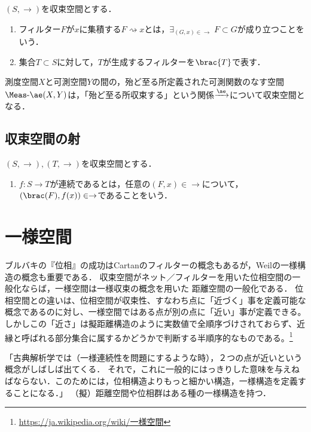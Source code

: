 \documentclass[uplatex,dvipdfmx]{jsreport}
\begin{document}
\begin{definition}
    $(S,\to)$を収束空間とする．
    \begin{enumerate}
        \item フィルター$F$が$x$に集積する$F\rightsquigarrow x$とは，$\exists_{(G,x)\in\to}\;F\subset G$が成り立つことをいう．
        \item 集合$T\subset S$に対して，$T$が生成するフィルターを$\brac{T}$で表す．
    \end{enumerate}
\end{definition}

\begin{example}
    測度空間$X$と可測空間$Y$の間の，殆ど至る所定義された可測関数のなす空間$\Meas\textrm{-}\ae(X,Y)$は，「殆ど至る所収束する」という関係$\xrightarrow{\ae}$について収束空間となる．
\end{example}

\subsection{収束空間の射}

\begin{definition}
    $(S,\to),(T,\to)$を収束空間とする．
    \begin{enumerate}
        \item $f:S\to T$が連続であるとは，任意の$(F,x)\in\to$について，$(\brac(F),f(x))\in\to$であることをいう．
    \end{enumerate}
\end{definition}

\section{一様空間}

\begin{tcolorbox}[colframe=ForestGreen, colback=ForestGreen!10!white, breakable ,colbacktitle=ForestGreen!40!white, coltitle=black,fonttitle=\bfseries\sffamily,
    title=全体のポイント]
    ブルバキの『位相』の成功はCartanのフィルターの概念もあるが，Weilの一様構造の概念も重要である．
    収束空間がネット／フィルターを用いた位相空間の一般化ならば，一様空間は一様収束の概念を用いた
    距離空間の一般化である．
    位相空間との違いは、位相空間が収束性、すなわち点に「近づく」事を定義可能な概念であるのに対し、一様空間ではある点が別の点に「近い」事が定義できる。しかしこの「近さ」は擬距離構造のように実数値で全順序づけされておらず、近縁と呼ばれる部分集合に属するかどうかで判断する半順序的なものである。\footnote{\url{https://ja.wikipedia.org/wiki/一様空間}}

    「古典解析学では（一様連続性を問題にするような時），２つの点が近いという概念がしばしば出てくる．
    それで，これに一般的にはっきりした意味を与えねばならない．このためには，位相構造よりもっと細かい構造，一様構造を定義することになる．」\cite{Bourbaki}
    （擬）距離空間や位相群はある種の一様構造を持つ．
\end{tcolorbox}
\end{document}
